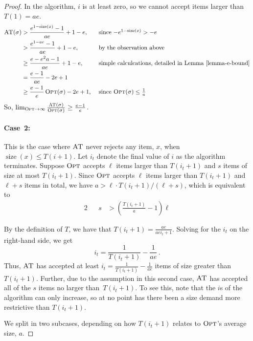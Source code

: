 \documentclass[a4paper,UKenglish,cleveref, autoref, thm-restate]{lipics-v2021}
\newcommand{\OPT}{\ensuremath{\operatorname{\textsc{Opt}}}\xspace}
\newcommand{\ADB}{\ensuremath{\operatorname{\textsc{AT}}}\xspace}
\newcommand{\TF}{T}
\newcommand{\SIZE}[1]{\ensuremath{\operatorname{\textrm{size}}(#1)}\xspace}
\begin{document}
\begin{proof}
In the algorithm, $i$ is at least zero, so we cannot
accept items larger than $\TF(1)=ae$.
\begin{alignat*}{2}
  \ADB(\sigma) & > \frac{e^{1 - \SIZE{x}}-1}{ae} + 1 - e,
  &&  \mbox{ since $- e^{1 - \SIZE{x}} > -e$} \\
  & >  \frac{e^{1 - ae}-1}{ae} + 1 - e,
  &&  \mbox{ by the observation above} \\
  & \geq  \frac{e-e^2a-1}{ae} + 1 - e,
  &&  \mbox{ simple calculcations, detailed in Lemma~\ref{lemma-e-bound}} \\
  & =  \frac{e-1}{ae} - 2e + 1 \\
  & \geq  \frac{e-1}{e}\OPT(\sigma) - 2e + 1,
  &&  \mbox{ since $\OPT(\sigma) \leq \frac{1}{a}$}
\end{alignat*}
So, $\lim_{\OPT\to\infty}\frac{\ADB(\sigma)}{\OPT(\sigma)}\geq \frac{e-1}{e}$.

\paragraph*{Case~2:}
This is the case where \ADB never
rejects any item, $x$, when $\SIZE{x} \leq \TF(i+1)$.
Let $i_t$ denote the final value of $i$ as the algorithm terminates.
Suppose \OPT accepts $\ell$ items larger than $\TF(i_t+1)$ and $s$ items of
size at most $\TF(i_t+1)$.
Since \OPT accepts $\ell$ items larger than $\TF(i_t+1)$ and $\ell+s$
items in total, we have $a > \ell \cdot \TF(i_t+1) / (\ell+s)$, which is equivalent to
\begin{alignat}{2}
  \label{ineq:s}
  && s & > \left(\frac{\TF(i_t+1)}{a}-1\right)\ell
\end{alignat}

By the definition of $\TF$, we have that $\TF(i_t+1)=\frac{ae}{aei_t+1}$.
Solving for the $i_t$ on the right-hand side, we get
\begin{equation}
  \label{eq:it}
  i_t=\frac{1}{\TF(i_t+1)}-\frac{1}{ae} \,.
\end{equation}
Thus, \ADB has accepted at least
$i_t=\frac{1}{\TF(i_t+1)}-\frac{1}{ae}$ items of size greater than~$\TF(i_t+1)$.  Further, due to the
assumption in this second case, \ADB has accepted all of the $s$ items no larger
than~$\TF(i_t+1)$.  To see this, note that the $i$s of the algorithm can
only increase, so at no point has there been a size demand more
restrictive than $\TF(i_t+1)$.

We split in two subcases, depending on how $\TF(i_t+1)$ relates to \OPT's
average size, $a$.


\end{proof}
\end{document}

